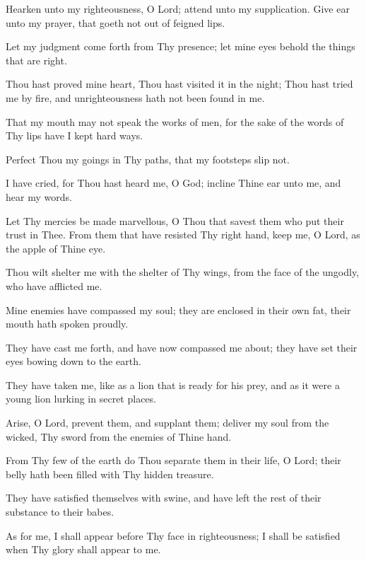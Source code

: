 Hearken unto my righteousness, O Lord; attend unto my supplication. Give ear unto my prayer, that goeth not out of feigned lips.

Let my judgment come forth from Thy presence; let mine eyes behold the things that are right.

Thou hast proved mine heart, Thou hast visited it in the night; Thou hast tried me by fire, and unrighteousness hath not been found in me.

That my mouth may not speak the works of men, for the sake of the words of Thy lips have I kept hard ways.

Perfect Thou my goings in Thy paths, that my footsteps slip not.

I have cried, for Thou hast heard me, O God; incline Thine ear unto me, and hear my words.

Let Thy mercies be made marvellous, O Thou that savest them who put their trust in Thee. From them that have resisted Thy right hand, keep me, O Lord, as the apple of Thine eye.

Thou wilt shelter me with the shelter of Thy wings, from the face of the ungodly, who have afflicted me.

Mine enemies have compassed my soul; they are enclosed in their own fat, their mouth hath spoken proudly.

They have cast me forth, and have now compassed me about; they have set their eyes bowing down to the earth.

They have taken me, like as a lion that is ready for his prey, and as it were a young lion lurking in secret places.

Arise, O Lord, prevent them, and supplant them; deliver my soul from the wicked, Thy sword from the enemies of Thine hand.

From Thy few of the earth do Thou separate them in their life, O Lord; their belly hath been filled with Thy hidden treasure.

They have satisfied themselves with swine, and have left the rest of their substance to their babes.

As for me, I shall appear before Thy face in righteousness; I shall be satisfied when Thy glory shall appear to me.
